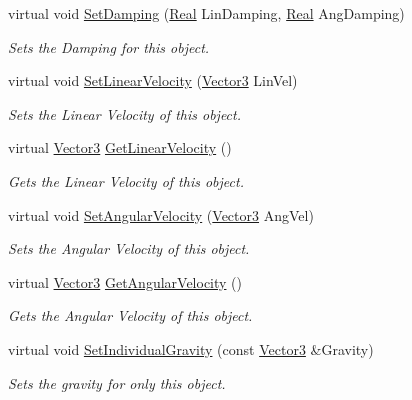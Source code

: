 \begin{DoxyCompactItemize}
virtual void \hyperlink{classphys_1_1ActorRigid_a228fc92e7db56d07e441e6812ac28288}{SetDamping} (\hyperlink{namespacephys_af7eb897198d265b8e868f45240230d5f}{Real} LinDamping, \hyperlink{namespacephys_af7eb897198d265b8e868f45240230d5f}{Real} AngDamping)
\begin{DoxyCompactList}\small\item\em Sets the Damping for this object. \item\end{DoxyCompactList}\item 
virtual void \hyperlink{classphys_1_1ActorRigid_a2b25eed4dcd594796c35a549d1c87559}{SetLinearVelocity} (\hyperlink{classphys_1_1Vector3}{Vector3} LinVel)
\begin{DoxyCompactList}\small\item\em Sets the Linear Velocity of this object. \item\end{DoxyCompactList}\item 
virtual \hyperlink{classphys_1_1Vector3}{Vector3} \hyperlink{classphys_1_1ActorRigid_add50c9f86048470de3e04e0de1e0e498}{GetLinearVelocity} ()
\begin{DoxyCompactList}\small\item\em Gets the Linear Velocity of this object. \item\end{DoxyCompactList}\item 
virtual void \hyperlink{classphys_1_1ActorRigid_a00ae9cd063f7f879d6bee15c807101d2}{SetAngularVelocity} (\hyperlink{classphys_1_1Vector3}{Vector3} AngVel)
\begin{DoxyCompactList}\small\item\em Sets the Angular Velocity of this object. \item\end{DoxyCompactList}\item 
virtual \hyperlink{classphys_1_1Vector3}{Vector3} \hyperlink{classphys_1_1ActorRigid_a54393bf3756324875497960bd9215b2e}{GetAngularVelocity} ()
\begin{DoxyCompactList}\small\item\em Gets the Angular Velocity of this object. \item\end{DoxyCompactList}\item 
virtual void \hyperlink{classphys_1_1ActorRigid_abaaf9dc4b7c90059c8fdfcab25357764}{SetIndividualGravity} (const \hyperlink{classphys_1_1Vector3}{Vector3} \&Gravity)
\begin{DoxyCompactList}\small\item\em Sets the gravity for only this object. \item\end{DoxyCompactList}\item 

\end{DoxyCompactItemize}
